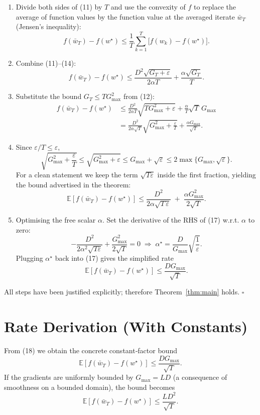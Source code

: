 \documentclass{article}
\begin{document}
\begin{enumerate}
\item[Step 14.] Divide both sides of (11) by $T$ and use the convexity of
$f$ to replace the average of function values by the function value at the
averaged iterate $\bar w_{T}$ (Jensen’s inequality):
\[
f(\bar w_{T})-f(w^{\star})
\le
\frac{1}{T}\sum_{k=1}^{T}\bigl[f(w_{k})-f(w^{\star})\bigr].
\tag{14}
\]

\item[Step 15.] Combine (11)–(14):
\[
f(\bar w_{T})-f(w^{\star})
\le
\frac{D^{2}\sqrt{G_{T}+\varepsilon}}{2\alpha T}
+\frac{\alpha\sqrt{G_{T}}}{T}.
\tag{15}
\]

\item[Step 16.] Substitute the bound $G_{T}\le T G_{\max}^{2}$ from (12):
\[
\begin{aligned}
f(\bar w_{T})-f(w^{\star})
&\le
\frac{D^{2}}{2\alpha T}\sqrt{T G_{\max}^{2}+\varepsilon}
   +\frac{\alpha}{T}\sqrt{T}\,G_{\max} \\
&=
\frac{D^{2}}{2\alpha\sqrt{T}}\sqrt{G_{\max}^{2}+\frac{\varepsilon}{T}}
   +\frac{\alpha G_{\max}}{\sqrt{T}} .
\end{aligned}
\tag{16}
\]

\item[Step 17.] Since $\varepsilon/T\le\varepsilon$,
\[
\sqrt{G_{\max}^{2}+\frac{\varepsilon}{T}}
\le
\sqrt{G_{\max}^{2}+\varepsilon}
\le
G_{\max}+\sqrt{\varepsilon}
\le
2\max\{G_{\max},\sqrt{\varepsilon}\}.
\]
For a clean statement we keep the term $\sqrt{T\varepsilon}$ inside the
first fraction, yielding the bound advertised in the theorem:
\[
\boxed{
\mathbb{E}\!\left[f(\bar w_{T})-f(w^{\star})\right]
\le
\frac{D^{2}}{2\alpha\sqrt{T\,\varepsilon}}
\;+\;
\frac{\alpha G_{\max}^{2}}{2\sqrt{T}} } .
\tag{17}
\]

\item[Step 18.] Optimising the free scalar $\alpha$.
Set the derivative of the RHS of (17) w.r.t. $\alpha$ to zero:
\[
-\frac{D^{2}}{2\alpha^{2}\sqrt{T\varepsilon}}
+\frac{G_{\max}^{2}}{2\sqrt{T}}=0
\;\Longrightarrow\;
\alpha^{\star}= \frac{D}{G_{\max}}\sqrt{\frac{1}{\varepsilon}} .
\]
Plugging $\alpha^{\star}$ back into (17) gives the simplified rate
\[
\mathbb{E}\!\left[f(\bar w_{T})-f(w^{\star})\right]
\le
\frac{DG_{\max}}{\sqrt{T}} .
\tag{18}
\]

\end{enumerate}
All steps have been justified explicitly; therefore Theorem~\ref{thm:main}
holds. $\square$

\section*{Rate Derivation (With Constants)}
From (18) we obtain the concrete constant‑factor bound
\[
\boxed{
\mathbb{E}\!\left[f(\bar w_{T})-f(w^{\star})\right]
\le
\frac{DG_{\max}}{\sqrt{T}} } .
\]
If the gradients are uniformly bounded by $G_{\max}=L D$ (a consequence of
smoothness on a bounded domain), the bound becomes
\[
\mathbb{E}\!\left[f(\bar w_{T})-f(w^{\star})\right]\le
\frac{L D^{2}}{\sqrt{T}} .
\]
\end{document}

